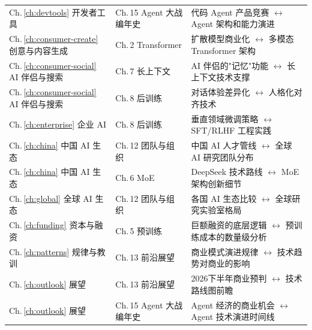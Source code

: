\begin{tabularx}{\textwidth}{@{}l l X@{}}
Ch.\,\ref{ch:devtools} 开发者工具 &
Ch.\,15 Agent 大战编年史 &
代码 Agent 产品竞赛 $\leftrightarrow$ Agent 架构和能力演进 \\
\addlinespace

Ch.\,\ref{ch:consumer-create} 创意与内容生成 &
Ch.\,2 Transformer &
扩散模型商业化 $\leftrightarrow$ 多模态 Transformer 架构 \\
\addlinespace

Ch.\,\ref{ch:consumer-social} AI 伴侣与搜索 &
Ch.\,7 长上下文 &
AI 伴侣的"记忆"功能 $\leftrightarrow$ 长上下文技术支撑 \\
\addlinespace

Ch.\,\ref{ch:consumer-social} AI 伴侣与搜索 &
Ch.\,8 后训练 &
对话体验差异化 $\leftrightarrow$ 人格化对齐技术 \\
\addlinespace

Ch.\,\ref{ch:enterprise} 企业 AI &
Ch.\,8 后训练 &
垂直领域微调策略 $\leftrightarrow$ SFT/RLHF 工程实践 \\
\addlinespace

Ch.\,\ref{ch:china} 中国 AI 生态 &
Ch.\,12 团队与组织 &
中国 AI 人才管线 $\leftrightarrow$ 全球 AI 研究团队分布 \\
\addlinespace

Ch.\,\ref{ch:china} 中国 AI 生态 &
Ch.\,6 MoE &
DeepSeek 技术路线 $\leftrightarrow$ MoE 架构创新细节 \\
\addlinespace

Ch.\,\ref{ch:global} 全球 AI 生态 &
Ch.\,12 团队与组织 &
各国 AI 生态比较 $\leftrightarrow$ 全球研究实验室格局 \\
\addlinespace

Ch.\,\ref{ch:funding} 资本与融资 &
Ch.\,5 预训练 &
巨额融资的底层逻辑 $\leftrightarrow$ 预训练成本的数量级分析 \\
\addlinespace

Ch.\,\ref{ch:patterns} 规律与教训 &
Ch.\,13 前沿展望 &
商业模式演进规律 $\leftrightarrow$ 技术趋势对商业的影响 \\
\addlinespace

Ch.\,\ref{ch:outlook} 展望 &
Ch.\,13 前沿展望 &
2026下半年商业预判 $\leftrightarrow$ 技术路线图前瞻 \\
\addlinespace

Ch.\,\ref{ch:outlook} 展望 &
Ch.\,15 Agent 大战编年史 &
Agent 经济的商业机会 $\leftrightarrow$ Agent 技术演进时间线 \\

\bottomrule
\end{tabularx}

